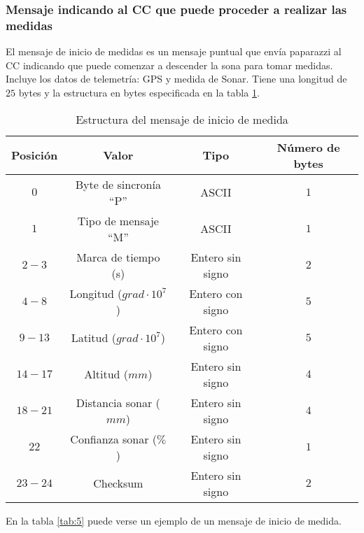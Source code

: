 \subsubsection{Mensaje indicando al CC que puede proceder a realizar las medidas}

El mensaje de inicio de medidas es un mensaje puntual que envía paparazzi al CC indicando que puede comenzar a descender la sona para tomar medidas. Incluye los datos de telemetría: GPS y medida de Sonar. Tiene una longitud de $25$ bytes y la estructura en bytes especificada en la tabla \ref{tab:4}.

\begin{table}[h]
	\centering
	\caption{Estructura del mensaje de inicio de medida}
	\begin{tabular}{|c|c|c|c|}\hline 
		\textbf{Posición}	& \textbf{Valor} & \textbf{Tipo} &\textbf{Número de bytes} \\ \hline \hline 
		$0$		& Byte de sincronía ``P''				& ASCII	 			&	$1$ \\  \hline
		$1$		& Tipo de mensaje ``M''				& ASCII	 			&	$1$ \\  \hline
		$2-3$	& Marca de tiempo (s)				& Entero sin signo	&   $2$ \\  \hline
		$4-8$	& Longitud ($grad \cdot 10^{7}$)	& Entero con signo	&   $5$ \\  \hline
		$9-13$	& Latitud ($grad \cdot 10^{7}$)		& Entero con signo	&  	$5$ \\  \hline
		$14-17$	& Altitud ($mm$)					& Entero sin signo	&   $4$ \\  \hline
		$18-21$	& Distancia sonar ($mm$)			& Entero sin signo	&   $4$ \\  \hline
		$22$	& Confianza sonar ($\%$)			& Entero sin signo	&   $1$ \\  \hline
		$23-24$	& Checksum 							& Entero sin signo	&   $2$ \\  \hline
	\end{tabular}
	\label{tab:4}
\end{table}

En la tabla \ref{tab:5} puede verse un ejemplo de un mensaje de inicio de medida.

